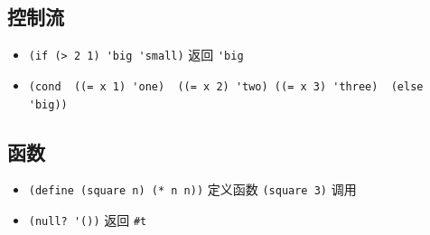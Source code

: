 \subsection{控制流}
\begin{itemize}
\item \verb`(if (> 2 1) 'big 'small)` 返回 \verb`'big`
\item \verb`(cond  ((= x 1) 'one)  ((= x 2) 'two) ((= x 3) 'three)  (else 'big))`
\end{itemize}

\subsection{函数}
\begin{itemize}
\item \verb`(define (square n) (* n n))` 定义函数 \verb`(square 3)` 调用
\item \verb`(null? '())` 返回 \verb`#t`
\end{itemize}
